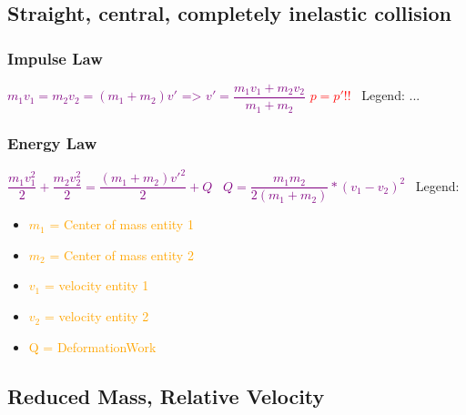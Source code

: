 \documentclass[main.tex,fontsize=8pt,paper=a4,paper=portrait,DIV=calc,]{scrartcl}
\begin{document}
\begin{multicols*}{2}
\subsection{Straight, central, completely inelastic collision}

\subsubsection{Impulse Law}
\vspace{2mm}
\large \textcolor{purple}{\( m_1v_1 = m_2v_2 = (m_1 + m_2 )v' \text{ => } v' = \dfrac{m_1v_1 + m_2v_2}{m_1 + m_2}\)}\newline
\textcolor{red}{\( p = p' \)!!}\newline
\normalsize \, \newline
Legend:\newline
...

\subsubsection{Energy Law}
\vspace{2mm}
\large \textcolor{purple}{\( \dfrac{m_1v_1^2}{2} + \dfrac{m_2v_2^2}{2} = \dfrac{(m_1 + m_2)v'^2}{2} + Q \)}\newline
\, \newline
\textcolor{purple}{\(Q = \dfrac{m_1m_2}{2(m_1+m_2)}*(v_1 -v_2)^2\)}\newline
\normalsize \, \newline
Legend:\newline
\begin{itemize}
\item \textcolor{orange}{\(m_1\) = Center of mass entity 1}
\item \textcolor{orange}{\(m_2\) = Center of mass entity 2}
\item \textcolor{orange}{\(v_1\) = velocity entity 1}
\item \textcolor{orange}{\(v_2\) = velocity entity 2}
\item \textcolor{orange}{Q = DeformationWork}
\end{itemize}


\subsection{Reduced Mass, Relative Velocity}

\end{multicols*}
\end{document}
